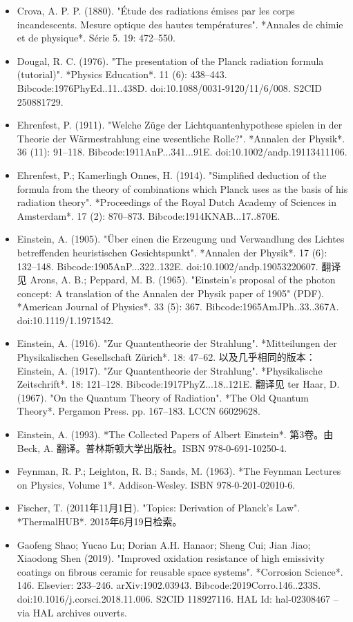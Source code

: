 \begin{itemize}
\item Crova, A. P. P. (1880). "Étude des radiations émises par les corps incandescents. Mesure optique des hautes températures". *Annales de chimie et de physique*. Série 5. 19: 472–550.  
\item Dougal, R. C. (1976). "The presentation of the Planck radiation formula (tutorial)". *Physics Education*. 11 (6): 438–443. Bibcode:1976PhyEd..11..438D. doi:10.1088/0031-9120/11/6/008. S2CID 250881729.  
\item Ehrenfest, P. (1911). "Welche Züge der Lichtquantenhypothese spielen in der Theorie der Wärmestrahlung eine wesentliche Rolle?". *Annalen der Physik*. 36 (11): 91–118. Bibcode:1911AnP...341...91E. doi:10.1002/andp.19113411106.  
\item Ehrenfest, P.; Kamerlingh Onnes, H. (1914). "Simplified deduction of the formula from the theory of combinations which Planck uses as the basis of his radiation theory". *Proceedings of the Royal Dutch Academy of Sciences in Amsterdam*. 17 (2): 870–873. Bibcode:1914KNAB...17..870E.  
\item Einstein, A. (1905). "Über einen die Erzeugung und Verwandlung des Lichtes betreffenden heuristischen Gesichtspunkt". *Annalen der Physik*. 17 (6): 132–148. Bibcode:1905AnP...322..132E. doi:10.1002/andp.19053220607.  
  翻译见 Arons, A. B.; Peppard, M. B. (1965). "Einstein's proposal of the photon concept: A translation of the Annalen der Physik paper of 1905" (PDF). *American Journal of Physics*. 33 (5): 367. Bibcode:1965AmJPh..33..367A. doi:10.1119/1.1971542.  
\item Einstein, A. (1916). "Zur Quantentheorie der Strahlung". *Mitteilungen der Physikalischen Gesellschaft Zürich*. 18: 47–62. 以及几乎相同的版本：Einstein, A. (1917). "Zur Quantentheorie der Strahlung". *Physikalische Zeitschrift*. 18: 121–128. Bibcode:1917PhyZ...18..121E.  
  翻译见 ter Haar, D. (1967). "On the Quantum Theory of Radiation". *The Old Quantum Theory*. Pergamon Press. pp. 167–183. LCCN 66029628.  
\item Einstein, A. (1993). *The Collected Papers of Albert Einstein*. 第3卷。由 Beck, A. 翻译。普林斯顿大学出版社。ISBN 978-0-691-10250-4.  
\item Feynman, R. P.; Leighton, R. B.; Sands, M. (1963). *The Feynman Lectures on Physics, Volume 1*. Addison-Wesley. ISBN 978-0-201-02010-6.  
\item Fischer, T. (2011年11月1日). "Topics: Derivation of Planck's Law". *ThermalHUB*. 2015年6月19日检索。  
\item Gaofeng Shao; Yucao Lu; Dorian A.H. Hanaor; Sheng Cui; Jian Jiao; Xiaodong Shen (2019). "Improved oxidation resistance of high emissivity coatings on fibrous ceramic for reusable space systems". *Corrosion Science*. 146. Elsevier: 233–246. arXiv:1902.03943. Bibcode:2019Corro.146..233S. doi:10.1016/j.corsci.2018.11.006. S2CID 118927116. HAL Id: hal-02308467 – via HAL archives ouverts.  

\end{itemize}
